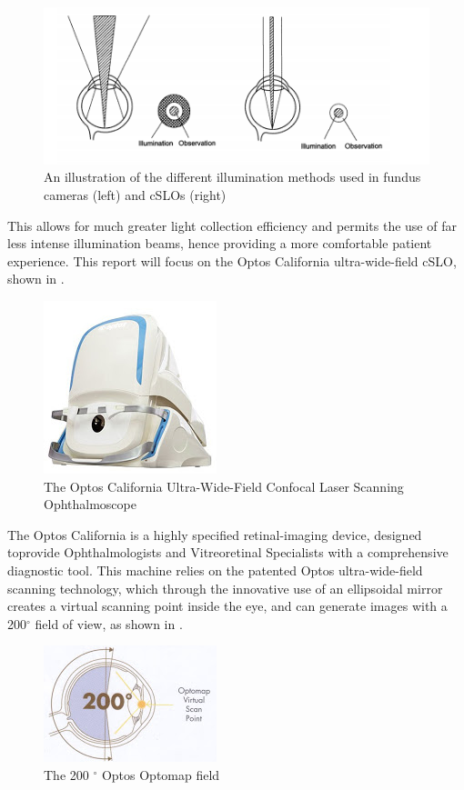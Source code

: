 \begin{figure}[H]
\centering
\includegraphics{figures/illumination}
\caption{An illustration of the different illumination methods used in fundus cameras (left) and cSLOs (right)}
\label{fig:illum}
   \end{figure}

This allows for much greater light collection efficiency and permits the use
of far less intense illumination beams, hence providing a more comfortable
patient experience.\cite{5_bennett_2015} This report will focus on the Optos
California ultra-wide-field cSLO, shown in .

\begin{figure}[H]
\centering
\includegraphics{figures/california}
\caption{The Optos California Ultra-Wide-Field Confocal Laser Scanning Ophthalmoscope}
\label{fig:cali}
   \end{figure}


The Optos California is a highly specified retinal-imaging device,
designed toprovide Ophthalmologists and Vitreoretinal Specialists
with a comprehensive diagnostic tool. This machine relies on the
patented Optos ultra-wide-field scanning technology, which through
the innovative use of an ellipsoidal mirror creates a virtual scanning
point inside the eye, and can generate images with a 200$^\circ$ field
of view, as shown in . 

\begin{figure}[H]
\centering
\includegraphics{figures/optoswide}
\caption{The 200 $^\circ$ Optos Optomap field}
\label{fig:wideview}
   \end{figure}

